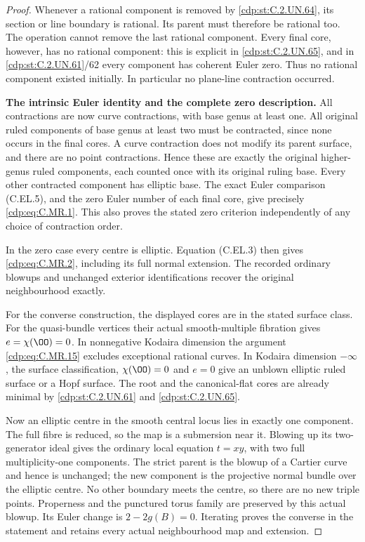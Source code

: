 \begin{proof}
Whenever a rational component
is removed by \ref{cdp:st:C.2.UN.64}, its
section or line boundary is
rational. Its parent must
therefore be rational too.
The operation cannot remove
the last rational component.
Every final core, however,
has no rational component:
this is explicit in \ref{cdp:st:C.2.UN.65},
and in \ref{cdp:st:C.2.UN.61}/62 every
component has coherent
Euler zero. Thus no rational
component existed initially.
In particular no plane-line
contraction occurred.

\par\medskip\noindent\textbf{The intrinsic Euler identity and the complete zero description.}
All contractions are now
curve contractions, with
base genus at least one.
All original ruled components
of base genus at least two
must be contracted, since
none occurs in the final
cores. A curve contraction
does not modify its parent
surface, and there are no
point contractions. Hence
these are exactly the
original higher-genus ruled
components, each counted once
with its original ruling base.
Every other contracted
component has elliptic base.
The exact Euler comparison
(C.EL.5), and the zero Euler
number of each final core,
give precisely \eqref{cdp:eq:C.MR.1}.
This also proves the stated
zero criterion independently
of any choice of contraction
order.

In the zero case every
centre is elliptic.
Equation (C.EL.3) then
gives \eqref{cdp:eq:C.MR.2}, including
its full normal extension.
The recorded ordinary
blowups and unchanged
exterior identifications
recover the original
neighbourhood exactly.

For the converse construction,
the displayed cores are in
the stated surface class.
For the quasi-bundle vertices
their actual smooth-multiple
fibration gives $e=\chi(\OO)=0$.
In nonnegative Kodaira dimension
the argument \eqref{cdp:eq:C.MR.15} excludes
exceptional rational curves.
In Kodaira dimension $-\infty$,
the surface classification,
$\chi(\OO)=0$ and $e=0$
give an unblown elliptic ruled
surface or a Hopf surface.
The root and the canonical-flat
cores are already minimal by
\ref{cdp:st:C.2.UN.61} and \ref{cdp:st:C.2.UN.65}.

Now
an elliptic centre in the
smooth central locus lies
in exactly one component.
The full fibre is reduced,
so the map is a submersion
near it. Blowing up its
two-generator ideal gives
the ordinary local equation
$t=xy$, with two full
multiplicity-one components.
The strict parent is the
blowup of a Cartier curve
and hence is unchanged;
the new component is the
projective normal bundle
over the elliptic centre.
No other boundary meets the
centre, so there are no
new triple points.
Properness and the punctured
torus family are preserved
by this actual blowup.
Its Euler change is
$2-2g(B)=0$. Iterating
proves the converse in
the statement and retains
every actual neighbourhood
map and extension.


\end{proof}
